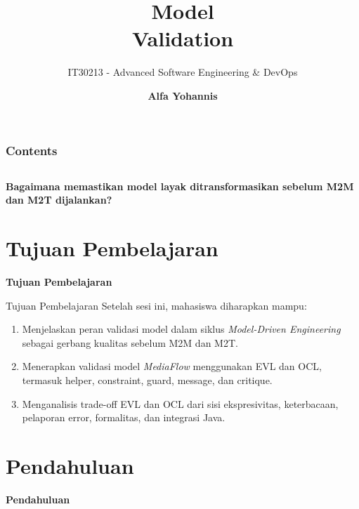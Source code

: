 \documentclass[aspectratio=169, table]{beamer}
\subtitle{IT30213 - Advanced Software Engineering \& DevOps}
\title{\Huge Model\vspace{8pt}\\Validation}
\author{\textbf{Alfa Yohannis}}
\begin{document}
\frame{\titlepage}

\begin{frame}[fragile]
	\frametitle{Contents}
	\vspace{20pt}
	\begin{columns}[t]
		\tableofcontents[sections={1-4}]

		\tableofcontents[sections={5-8}]
	\end{columns}
\end{frame}

\begin{frame}{\hfill}
	\centering
	\Huge{\textbf{Bagaimana memastikan model layak ditransformasikan sebelum M2M dan M2T dijalankan?}}
\end{frame}

\section{Tujuan Pembelajaran}
\begin{frame}{\hfill}
	\centering
	\Huge{\textbf{Tujuan Pembelajaran}}
\end{frame}

\begin{frame}{Tujuan Pembelajaran}
\vspace{6pt}
Setelah sesi ini, mahasiswa diharapkan mampu:
\begin{enumerate}
  \item Menjelaskan peran validasi model dalam siklus \textit{Model-Driven Engineering} sebagai gerbang kualitas sebelum M2M dan M2T.
  \item Menerapkan validasi model \textit{MediaFlow} menggunakan EVL dan OCL, termasuk helper, constraint, guard, message, dan critique.
  \item Menganalisis trade-off EVL dan OCL dari sisi ekspresivitas, keterbacaan, pelaporan error, formalitas, dan integrasi Java.
\end{enumerate}
\end{frame}

\section{Pendahuluan}
\begin{frame}{\hfill}
	\centering
	\Huge{\textbf{Pendahuluan}}
\end{frame}
\end{document}
